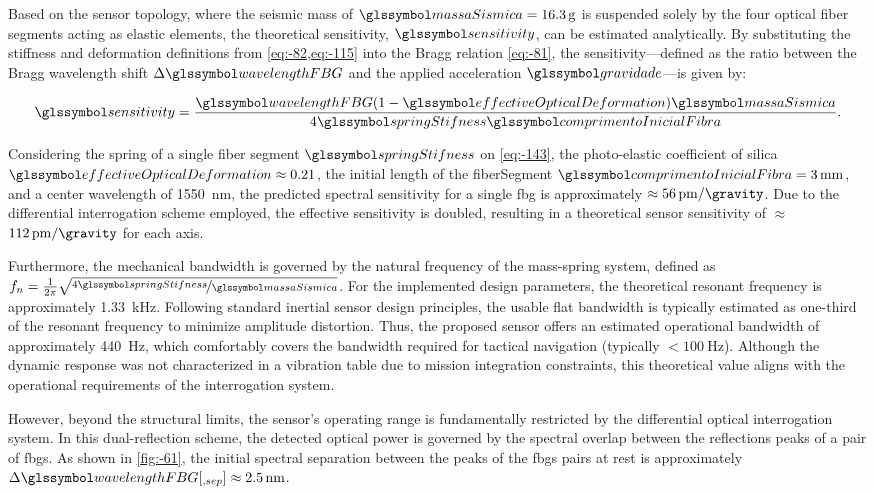 \documentclass[sensors,article,accept,pdftex,moreauthors]{Definitions/mdpi}
\begin{document}
Based on the sensor topology, where the seismic mass of $\massaSismica = \SI{16.3}{\gram}$ is suspended solely by the four optical fiber segments acting as elastic elements, the theoretical sensitivity, $\sensitivity$, can be estimated analytically. By substituting the stiffness and deformation definitions from \cref{eq:-82,eq:-115} into the Bragg relation \cref{eq:-81}, the sensitivity—defined as the ratio between the Bragg wavelength shift $\Delta \wavelengthFBG$ and the applied acceleration $\gravidade$—is given by:

\begin{equation}
	\sensitivity = \frac{\wavelengthFBG (1 - \effectiveOpticalDeformation) \massaSismica}{4 \springStifness \comprimentoInicialFibra}.
	\label{eq:-179}
\end{equation}

Considering the spring of a single fiber segment $\springStifness$ on \cref{eq:-143}, the photo-elastic coefficient of silica $\effectiveOpticalDeformation \approx 0.21$, the initial length of the \gls{fiberSegment} $\comprimentoInicialFibra=\SI{3}{\mm}$, and a center wavelength of \SI{1550}{\nano\meter}, the predicted spectral sensitivity for a single \gls{fbg} is approximately $\approx\SI{56}{\pico\meter\per\gravity}$. Due to the differential interrogation scheme employed, the effective sensitivity is doubled, resulting in a theoretical sensor sensitivity of $\approx$$\SI{112}{\pico\meter\per\gravity}$ for each axis.



Furthermore, the mechanical bandwidth is governed by the natural frequency of the mass-spring system, defined as $f_n = \frac{1}{2\pi}\sqrt{\nicefrac{4\springStifness}{\massaSismica}}$. For the implemented design parameters, the theoretical resonant frequency is approximately \SI{1.33}{\kilo\hertz}. Following standard inertial sensor design principles, the usable flat bandwidth is typically estimated as one-third of the resonant frequency to minimize amplitude distortion. Thus, the proposed sensor offers an estimated operational bandwidth of approximately \SI{440}{\hertz}, which comfortably covers the bandwidth required for tactical navigation (typically $< \SI{100}{\hertz}$). Although the dynamic response was not characterized in a vibration table due to mission integration constraints, this theoretical value aligns with the operational requirements of the interrogation system.


However, beyond the structural limits, the sensor's operating range is fundamentally restricted by the differential optical interrogation system. In this dual-reflection scheme, the detected optical power is governed by the spectral overlap between the reflections peaks of a pair of \glspl{fbg}. As shown in \cref{fig:-61}, the initial spectral separation between the peaks of the \glspl{fbg} pairs at rest is approximately $\Delta\wavelengthFBG[{}_{,sep}] \approx \SI{2.5}{\nano\meter}$.
\end{document}
